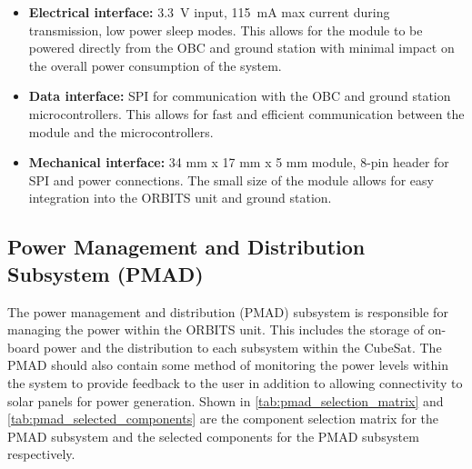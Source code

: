\documentclass[a4paper,12pt,titlepage]{report}
\begin{document}
\begin{itemize}
    \item \textbf{Electrical interface:} 3.3~V input, 115~mA max current during transmission, low power sleep modes. This allows for the module to be powered directly from the OBC and ground station with minimal impact on the overall power consumption of the system.
    \item \textbf{Data interface:} SPI for communication with the OBC and ground station microcontrollers. This allows for fast and efficient communication between the module and the microcontrollers.
    \item \textbf{Mechanical interface:} 34 mm x 17 mm x 5 mm module, 8-pin header for SPI and power connections. The small size of the module allows for easy integration into the ORBITS unit and ground station.
\end{itemize}

\subsection{Power Management and Distribution Subsystem (PMAD)}

The power management and distribution (PMAD) subsystem is responsible for managing the power within the ORBITS unit. This includes the storage of on-board power and the distribution to each subsystem within the CubeSat. The PMAD should also contain some method of monitoring the power levels within the system to provide feedback to the user in addition to allowing connectivity to solar panels for power generation. Shown in \ref{tab:pmad_selection_matrix} and \ref{tab:pmad_selected_components} are the component selection matrix for the PMAD subsystem and the selected components for the PMAD subsystem respectively.
\end{document}
